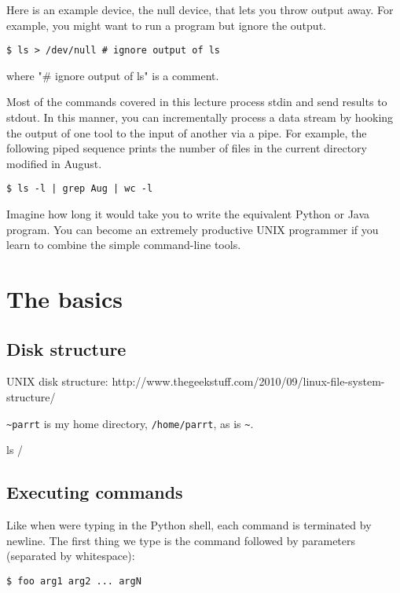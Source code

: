 \begin{fullwidth}
Here is an example device, the null device, that lets you throw output away. For example, you might want to run a program but ignore the output.

\begin{lstlisting}[style=BashInputStyle]
$ ls > /dev/null # ignore output of ls
\end{lstlisting}

\noindent where "\# ignore output of ls" is a comment.

Most of the commands covered in this lecture process stdin and send results to stdout. In this manner, you can incrementally process a data stream by hooking the output of one tool to the input of another via a pipe. For example, the following piped sequence prints the number of files in the current directory modified in August.

\begin{lstlisting}[style=BashInputStyle]
$ ls -l | grep Aug | wc -l
\end{lstlisting}

Imagine how long it would take you to write the equivalent Python or Java program. You can become an extremely productive UNIX programmer if you learn to combine the simple command-line tools.

\section{The basics}

\subsection{Disk structure}

UNIX disk structure: http://www.thegeekstuff.com/2010/09/linux-file-system-structure/

{\tt \verb|~|parrt} is my home directory, {\tt /home/parrt}, as is {\tt \verb|~|}.

{\small
\bash[script,stdout, prefix=$]
ls /
\END
}

\subsection{Executing commands}

Like when were typing in the Python shell, each command is terminated by newline. The first thing we type is the command followed by parameters (separated by whitespace):

\begin{lstlisting}[style=BashInputStyle]
$ foo arg1 arg2 ... argN
\end{lstlisting}


\end{fullwidth}
